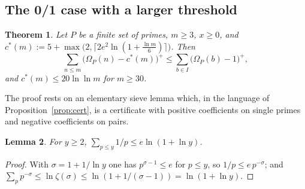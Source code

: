 \documentclass[11pt]{article}
\newtheorem{theorem}{Theorem}[section]
\newtheorem{lemma}[theorem]{Lemma}
\theoremstyle{definition}
\begin{document}
\subsection*{The 0/1 case with a larger threshold}

\begin{theorem}\label{thm:A}
Let $P$ be a finite set of primes, $m\ge3$, $x\ge0$, and
$c^*(m):=5+\max\bigl(2,\lceil2e^2\ln(1+\tfrac{\ln m}6)\rceil\bigr)$. Then
\begin{equation}\label{eq:thmA}
\sum_{n\le m}\bigl(\Omega_P(n)-c^*(m)\bigr)^+\le\sum_{b\in I}\bigl(\Omega_P(b)-1\bigr)^+,
\end{equation}
and $c^*(m)\le20\ln\ln m$ for $m\ge30$.
\end{theorem}

The proof rests on an elementary sieve lemma which, in the language of Proposition~\ref{prop:cert}, is a certificate with
positive coefficients on single primes and negative coefficients on pairs.

\begin{lemma}\label{lem:sumrecip}
For $y\ge2$, $\sum_{p\le y}1/p\le e\ln(1+\ln y)$.
\end{lemma}
\begin{proof}
With $\sigma=1+1/\ln y$ one has $p^{\sigma-1}\le e$ for $p\le y$, so $1/p\le e\,p^{-\sigma}$; and
$\sum_pp^{-\sigma}\le\ln\zeta(\sigma)\le\ln(1+1/(\sigma-1))=\ln(1+\ln y)$.
\end{proof}
\end{document}
